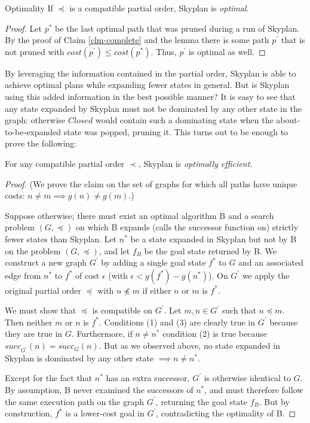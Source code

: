 \documentclass[letterpaper]{article}
\theoremstyle{plain} \newtheorem{theorem}{Theorem} \newtheorem{proposition}{Proposition} \newtheorem{lemma}{Lemma}
\theoremstyle{definition} \newtheorem{definition}{Definition} \newtheorem{conjecture}{Conjecture} \newtheorem*{example}{Example}
\theoremstyle{remark} \newtheorem*{remark}{Remark} \newtheorem*{note}{Note} \newtheorem{case}{Case}
\begin{document}
\begin{claim}{Optimality}\label{clm-optimal}
   If $\preceq$ is a compatible partial order, Skyplan
is \emph{optimal}.
\end{claim}
\begin{proof} 
Let $p^{*}$ be the last optimal path that was pruned during a run of Skyplan. 
By the proof of Claim \ref{clm-complete} and the lemma 
there is some path $p^\prime$ that is not pruned with $cost(p^\prime) \leq cost(p^{*})$.
Thus, $p^\prime$ is optimal as well.
\end{proof}

By leveraging the information contained in the partial order, Skyplan is able to achieve
optimal plans while expanding fewer states in general.  But is Skyplan using this added
information in the best possible manner? It is easy to see that any state expanded by 
Skyplan must not be dominated by any other state in the graph: otherwise $Closed$ would
contain such a dominating state when the about-to-be-expanded state was popped, pruning it.  This turns out to be enough to prove the following:

\begin{claim}{}\label{clm-optimally-efficient}
For any compatible partial order $\prec$, Skyplan is \emph{optimally efficient}.
\end{claim}
\begin{proof} 
(We prove the claim on the set of graphs for which all paths have unique costs: $n \neq m \implies g(n) \neq g(m)$.)

Suppose otherwise; there must exist an optimal algorithm B and a search problem $(G,\preceq)$ 
on which B expands (calls the successor function on) strictly fewer states than Skyplan. 
Let $n^{*}$ be a state expanded in Skyplan but not by B on the problem $(G,\preceq)$, and let
$f_{B}$ be the goal state returned by B. We construct a new graph $G^\prime$ by adding a single goal state $f^*$ to $G$ 
and an associated edge from $n^*$ to $f^*$ of cost $\epsilon$ (with $\epsilon < g(f^*)-g(n^*)$). 
On $G^\prime$ we apply the original partial order $\preceq$ with $n \npreceq m$ if either $n$ or $m$ is $f^*$.

We must show that $\preceq$ is compatible on $G^\prime$. 
Let $m,n \in G^\prime$ such that $n \preceq m$. Then neither $m$ or $n$ is $f^*$. Conditions (1) and (3) %
are clearly true in $G^\prime$ because they are true in $G$.  Furthermore, if $n \neq n^*$ condition (2) is true 
because $succ_{G^\prime}(n) = succ_{G}(n)$. 
But as we observed above, no state expanded in Skyplan is dominated by any other state $\implies n \neq n^*$.

Except for the fact that $n^*$ has an extra successor, $G^\prime$ is otherwise
 identical to $G$. By assumption, B never examined the successors of $n^*$, and 
must therefore follow the same execution path on the graph $G^\prime$, returning the goal state $f_B$.
But by construction, $f^*$ is a lower-cost goal in $G^\prime$, contradicting the optimality of B.
 \end{proof}
\end{document}
